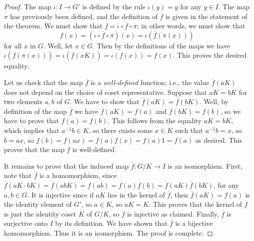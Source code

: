 \documentclass[11pt]{article}
\theoremstyle{definition}
\newcommand{\compose}{\circ} %
\begin{document}
\begin{proof}
The map $\iota: I \to G'$ is defined by the rule $\iota(y)=y$ for any
$y\in I$. The map $\pi$ has previously been defined, and the
definition of $\overline{f}$ is given in the statement of the theorem.
We must show that  $f = \iota \compose \overline{f} \compose \pi$; in
other words, we must show that 
$$ f(x) = (\iota \compose \overline{f} \compose \pi)(x) =
  \iota(\overline{f}(\pi(x)))
$$
for all $x$ in $G$. Well, let $x\in G$. Then by the definitions of the
maps we have $\iota(\overline{f}(\pi(x))) = \iota(\overline{f}(xK)) =
\iota(f(x)) = f(x)$. This proves the desired equality. 

Let us check that the map $\overline{f}$ is a {\em well-defined}
function; i.e., the value $\overline{f}(aK)$ does not depend on the
choice of coset representative. Suppose that $aK=bK$ for two elements
$a,b$ of $G$.  We have to show that $\overline{f}(aK) =
\overline{f}(bK)$. Well, by definition of the map $\overline{f}$ we
have $\overline{f}(aK) = f(a)$ and $\overline{f}(bK) = f(b)$, so we
have to prove that $f(a)=f(b)$. This follows from the equality $aK =
bK$, which implies that $a^{-1}b \in K$, so there exists some $x \in
K$ such that $a^{-1}b = x$, so $b=ax$, so $f(b) = f(ax) = f(a)f(x) =
f(a) 1 = f(a)$ as desired. This proves that the map $\overline{f}$ is
well-defined.

It remains to prove that the induced map $\overline{f}: G/K \to I$ is
an isomorphism. First, note that $\overline{f}$ is a homomorphism,
since $\overline{f}(aK\cdot bK) = \overline{f}(abK) = f(ab) = f(a)f(b)
= \overline{f}(aK) \overline{f}(bK)$, for any $a,b \in G$. It is
injective since if $aK$ lies in the kernel of $\overline{f}$, then
$\overline{f}(aK) = f(a)$ is the identity element of $G'$, so $a \in
K$, so $aK=K$. This proves that the kernel of $\overline{f}$ is just
the identity coset $K$ of $G/K$, so $\overline{f}$ is injective as
claimed.  Finally, $\overline{f}$ is surjective onto $I$ by its
definition.  We have shown that $\overline{f}$ is a bijective
homomorphism. Thus it is an isomorphism. The proof is complete.
\end{proof}
\end{document}
